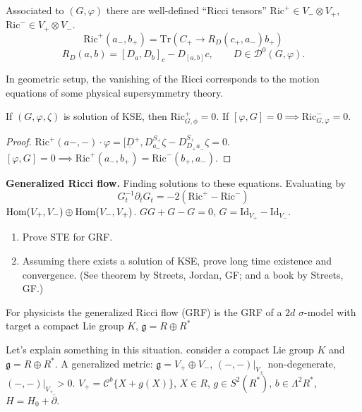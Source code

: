 \begin{lemma}
\label{lemma-Ricci-tensors}
Associated to $(G,\varphi)$ there are
well-defined ``Ricci tensors''
$\text{Ric}^+ \in V_- \otimes V_+$,
$\text{Ric}^- \in V_+ \otimes V_-$.
$$
\text{Ric}^+(a_-,b_+)=\text{Tr}(C_+ \to R_D(c_+,a_-)b_+)
$$
$$
R_D(a,b)=[D_a,D_b]_c-D_{[a,b]}c,\qquad D \in \mathcal{D}^0(G,\varphi).
$$
\begin{remark}
\label{remark-in-geometric-setup}
In geometric setup, the vanishing of the Ricci corresponds to
the motion equations of some physical supersymmetry theory.
\end{remark}

\begin{proposition}
\label{proposition-KSE}
If $(G,\varphi,\zeta)$ is solution of KSE, then
 $\text{Ric}^+_{G,\phi}=0$.
If $[\varphi,G]=0 \implies \text{Ric}^-_{G,\varphi}=0$.
\end{proposition}
\end{lemma}

\begin{proof}
$\text{Ric}^+(a-,-)\cdot \varphi=[\underline{D}^+,D_{a_-}^{S_+}\zeta
-D_{D_+a_-}^{S_+}\zeta=0$.
$[\varphi,G]=0 \implies  \text{Ric}^+(a_-,b_+)=\text{Ric}^-(b_+,a_-)$.
\end{proof}

\medskip\noindent
{\bf Generalized Ricci flow.}
Finding solutions to these equations.
Evaluating by
$$
G_t^{-1}\partial_tG_t=-2(\text{Ric}^+-\text{Ric}^-)
$$
$\mathop{\mathrm{Hom}}\nolimits(V_+,V_-) \oplus \mathop{\mathrm{Hom}}\nolimits(V_-,V_+)$.
$G G+G - G=0$, $G=\text{Id}_{V_+}-\text{Id}_{V_-}$.

\begin{exercise}
\label{exercise-}
\begin{enumerate}
\item Prove STE for GRF.
\item Assuming there exists a solution of KSE, prove long
time existence and convergence. (See theorem by Streets, Jordan, GF;
and a book by Streets, GF.)
\end{enumerate}
\end{exercise}

\begin{remark}
\label{remark-sigma-model}
For physicists the generalized Ricci flow (GRF) is the GRF of a $2d$
$\sigma$-model with target a compact Lie group 
$K$,  $\mathfrak{g}=R \oplus R^*$
\end{remark}

Let's explain something in this situation.
consider a compact Lie group $K$ and $\mathfrak{g}=R \oplus R^*$.
A generalized metric: $\mathfrak{g}=V_+ \oplus V_-$,
$(-,-)|_{V_\pm}$ non-degenerate,
$(-,-)|_{V_+}>0$.
$V_+=\mathcal{C}^b\{X+g(X)\}$,
$X \in R$, $g \in S^2(R^*)$, $b \in \Lambda^{2}R^*$,
$H=H_0+\overline{\partial}$.

